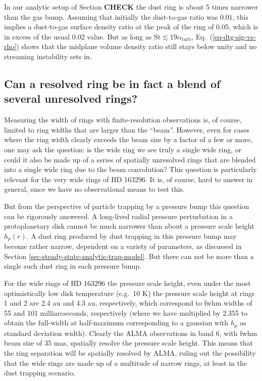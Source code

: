 \documentclass{aa}
\begin{document}
In our analytic setup of Section {\bf CHECK} %
the dust ring is about 5 times narrower than the gas bump. Assuming that
initially the dust-to-gas ratio was $0.01$, this implies a dust-to-gas surface
density ratio at the peak of the ring of $0.05$, which is in excess of the usual
$0.02$ value. But as long as $\mathrm{St}\lesssim 19\alpha_{\mathrm{turb}}$,
Eq.~(\ref{eq-dtg-sig-vs-rho}) shows that the midplane volume density ratio still
stays below unity and no streaming instability sets in.



\subsection{Can a resolved ring be in fact a blend of several unresolved rings?}
Measuring the width of rings with finite-resolution observations is, of course,
limited to ring widths that are larger than the ``beam''. However, even for
cases where the ring width clearly exceeds the beam size by a factor of a few or
more, one may ask the question: is the wide ring we see truly a single wide
ring, or could it also be made up of a series of spatially unresolved rings that
are blended into a single wide ring due to the beam convolution? This question
is particularly relevant for the very wide rings of HD 163296. It is, of course,
hard to answer in general, since we have no observational means to test this.

But from the perspective of particle trapping by a pressure bump this question
can be rigorously answered. A long-lived radial pressure perturbation in a
protoplanetary disk cannot be much narrower than about a pressure scale height
$h_p(r)$. A dust ring produced by dust trapping in this pressure bump may become
rather narrow, dependent on a variety of parameters, as discussed in
Section \ref{sec-steady-state-analytic-trap-model}. But there can not be
more than a single such dust ring in each pressure bump.

For the wide rings of HD 163296 the pressure scale height, even under the most
optimistically low disk temperature (e.g.~10 K) the pressure scale height at
rings 1 and 2 are 2.4 au and 4.3 au, respectively, which correspond to fwhm
widths of 55 and 101 milliarcseconds, respectively (where we have multiplied by
2.355 to obtain the full-width at half-maximum corresponding to a gaussian with
$h_p$ as standard deviation width). Clearly the ALMA observations in band 6,
with fwhm beam size of 35 mas, spatially resolve the pressure scale height.
This means that the ring separation will be spatially resolved by ALMA,
ruling out the possibility that the wide rings are made up of a multitude of
narrow rings, at least in the dust trapping scenario.
\end{document}
